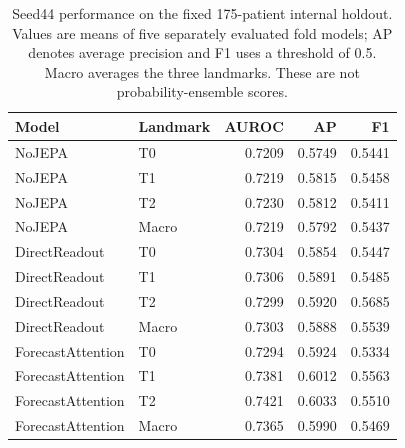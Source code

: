 \begin{table}[t]
\centering
\caption{Seed44 performance on the fixed 175-patient internal holdout. Values are means of five separately evaluated fold models; AP denotes average precision and F1 uses a threshold of 0.5. Macro averages the three landmarks. These are not probability-ensemble scores.}
\label{tab:main}
\small
\begin{tabular}{llrrr}
\toprule
Model & Landmark & AUROC & AP & F1 \\
\midrule
NoJEPA & T0 & 0.7209 & 0.5749 & 0.5441 \\
NoJEPA & T1 & 0.7219 & 0.5815 & 0.5458 \\
NoJEPA & T2 & 0.7230 & 0.5812 & 0.5411 \\
NoJEPA & Macro & 0.7219 & 0.5792 & 0.5437 \\
\midrule
DirectReadout & T0 & 0.7304 & 0.5854 & 0.5447 \\
DirectReadout & T1 & 0.7306 & 0.5891 & 0.5485 \\
DirectReadout & T2 & 0.7299 & 0.5920 & 0.5685 \\
DirectReadout & Macro & 0.7303 & 0.5888 & 0.5539 \\
\midrule
ForecastAttention & T0 & 0.7294 & 0.5924 & 0.5334 \\
ForecastAttention & T1 & 0.7381 & 0.6012 & 0.5563 \\
ForecastAttention & T2 & 0.7421 & 0.6033 & 0.5510 \\
ForecastAttention & Macro & 0.7365 & 0.5990 & 0.5469 \\
\bottomrule
\end{tabular}
\end{table}
